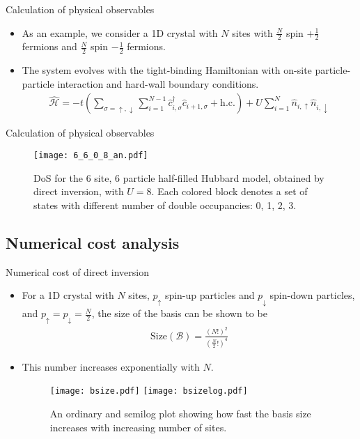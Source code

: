 \documentclass[usenames,dvipsnames]{beamer}
\newcommand{\ham}{\hat{\mathcal{H}}}
\begin{document}
	\begin{frame}{Calculation of physical observables}
		\begin{itemize}
			\item{
				As an example, we consider a 1D crystal with $ N $ sites with $ \tfrac{N}{2} $ spin $ +\tfrac{1}{2} $ fermions and $ \tfrac{N}{2} $ spin $ -\tfrac{1}{2} $ fermions.
				}
			\item {
				The system evolves with the tight-binding Hamiltonian with on-site particle-particle interaction and hard-wall boundary conditions.
			\begin{align}\label{eqn:tight-binding-hamil}
			\ham = -t \left(\sum_{\sigma = \uparrow, \downarrow} \sum_{i=1}^{N-1} \hat{c}^{\dagger}_{i, \sigma} \hat{c}^{}_{i + 1, \sigma} + \mathrm{h.c.} \right) + U \sum_{i=1}^{N}\hat{n}_{i,\uparrow} \hat{n}_{i,\downarrow}
			\end{align} }
		\end{itemize}
	\end{frame}
	
	\begin{frame}{Calculation of physical observables}
		\begin{figure}[h!]
			\centering
			\texttt{[image: 6\_6\_0\_8\_an.pdf]}
			\caption{DoS for the 6 site, 6 particle half-filled Hubbard model, obtained by direct inversion, with $ U=8 $. Each colored block denotes a set of states with different number of double occupancies: {\color{Orange}0}, {\color{RoyalPurple}1}, {\color{Cyan}2}, {\color{Green}3}.}
			\label{fig:6_6_0_8}
		\end{figure}
	\end{frame}

\subsection{Numerical cost analysis}
\begin{frame}{Numerical cost of direct inversion}
	\begin{itemize}
		\item{
			For a 1D crystal with $ N $ sites, $ p_{\uparrow} $ spin-up particles and $ p_{\downarrow} $ spin-down particles, and $ p_{\uparrow} = p_{\downarrow} = \tfrac{N}{2} $, the size of the basis can be shown to be
				\begin{align}
				\mathrm{Size}\left( \mathcal{B} \right) =
				\frac{\left( N! \right)^{2} }{\left( \tfrac{N}{2}! \right)^{4}}
				\end{align}
			}
		\item {
			This number increases exponentially with $ N $.
			}
		\begin{figure}[h!]
			\centering
				\texttt{[image: bsize.pdf]}\hspace{1cm}
				\texttt{[image: bsizelog.pdf]}
			\caption{An ordinary and semilog plot showing how fast the basis size increases with increasing number of sites.}
		\end{figure}
	\end{itemize}
\end{frame}
\end{document}

